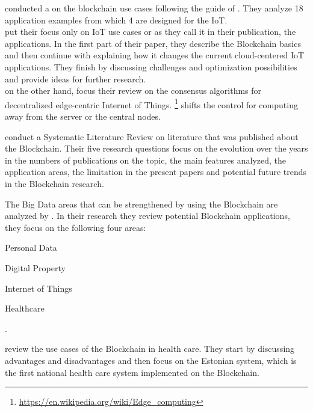 \begin{description}[noitemsep,align=left]
	\item[Internet of things] \cite{2016_Conoscenti,2018_Fernandez,2017_Yeow}
	\citet{2016_Conoscenti} conducted a  on the blockchain use cases following the guide of \citet{2007_Kitchenham}. They analyze 18 application examples from which 4 are designed for the IoT.\\
	\citet{2018_Fernandez} put their focus only on IoT use cases or as they call it in their publication, the  applications. In the first part of their paper, they describe the Blockchain basics and then continue with explaining how it changes the current cloud-centered IoT applications. They finish by discussing challenges and optimization possibilities and provide ideas for further research.\\
	\citet{2017_Yeow} on the other hand, focus their review on the consensus algorithms for decentralized edge-centric Internet of Things. \footnote{\url{https://en.wikipedia.org/wiki/Edge_computing}} shifts the control for computing away from the server or the central nodes.
	\item[Smart Places] \citet{2018_Brandao} conduct a Systematic Literature Review on literature that was published about the Blockchain. Their five research questions focus on the evolution over the years in the numbers of publications on the topic, the main features analyzed, the application areas, the limitation in the present papers and potential future trends in the Blockchain research.
	\item[Big Data] The Big Data areas that can be strengthened by using the Blockchain are analyzed by  \citet{2017_Karafiloski}. In their research they review potential Blockchain applications, they focus on the following four areas:
	\begin{enumerate*}[label={\Alph*)},font={\color{red!50!black}\bfseries}]
\item Personal Data
\item Digital Property
\item Internet of Things
\item Healthcare
\end{enumerate*}.
	\item[Healthcare]
	\citet{2018_Ekin} review the use cases of the Blockchain in health care. They start by discussing advantages and disadvantages and then focus on the Estonian system, which is the first national health care system implemented on the Blockchain.

\end{description}
